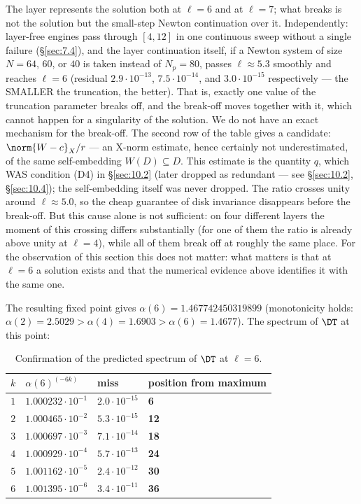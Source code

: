 The layer represents the solution both at $\ell = 6$ and at $\ell = 7$; what
breaks is not the solution but the small-step Newton continuation
over it. Independently: layer-free engines pass through $[4,12]$ in
one continuous sweep without a single failure (\S\ref{sec:7.4}), and the layer
continuation itself, if a Newton system of size $N = 64$, $60$, or $40$ is
taken instead of $N_{p} = 80$, passes $\ell \approx 5.3$ smoothly and reaches
$\ell = 6$ (residual $2.9\cdot 10^{-13}$, $7.5\cdot 10^{-14}$, and $3.0\cdot 10^{-15}$
respectively --- the SMALLER the truncation, the better). That is,
exactly one value of the truncation parameter breaks off, and the
break-off moves together with it, which cannot happen for a
singularity of the solution. We do not have an exact mechanism for
the break-off. The second row of the table gives a candidate:
$\norm{W-c}_{X}/r$ --- an X-norm estimate, hence certainly not underestimated,
of the same self-embedding $W(D) \subseteq D$. This estimate is the quantity
$q$, which WAS condition (D4) in
\S\ref{sec:10.2} (later dropped as redundant --- see \S\ref{sec:10.2}, \S\ref{sec:10.4}); the self-embedding
itself was never dropped. The ratio crosses
unity around $\ell \approx 5.0$, so the cheap guarantee of disk invariance
disappears before the break-off. But this cause alone is not
sufficient: on four different layers the moment of this crossing
differs substantially (for one of them the ratio is already above
unity at $\ell = 4$), while all of them break off at roughly the same
place.
For the observation of this section this does not matter: what matters
is that at $\ell = 6$ a solution exists and that the numerical evidence above
identifies it with the same one.

The resulting fixed point gives $\alpha(6) = 1.467742450319899$
(monotonicity holds: $\alpha(2) = 2.5029 > \alpha(4) = 1.6903 > \alpha(6) = 1.4677$).
The spectrum of $\DT$ at this point:

\begin{table}[ht]
\centering
\caption{Confirmation of the predicted spectrum of $\DT$ at $\ell = 6$.}
\label{tab:spectrum-ell6}
\begin{tabular}{clll}
\toprule
$k$ & $\alpha(6)^{(-6k)}$ & miss & position from maximum \\
\midrule
$1$ & $1.000232\cdot 10^{-1}$ & $2.0\cdot 10^{-15}$ & \textbf{6} \\
$2$ & $1.000465\cdot 10^{-2}$ & $5.3\cdot 10^{-15}$ & \textbf{12} \\
$3$ & $1.000697\cdot 10^{-3}$ & $7.1\cdot 10^{-14}$ & \textbf{18} \\
$4$ & $1.000929\cdot 10^{-4}$ & $5.7\cdot 10^{-13}$ & \textbf{24} \\
$5$ & $1.001162\cdot 10^{-5}$ & $2.4\cdot 10^{-12}$ & \textbf{30} \\
$6$ & $1.001395\cdot 10^{-6}$ & $3.4\cdot 10^{-11}$ & \textbf{36} \\
\bottomrule
\end{tabular}
\end{table}
\FloatBarrier

